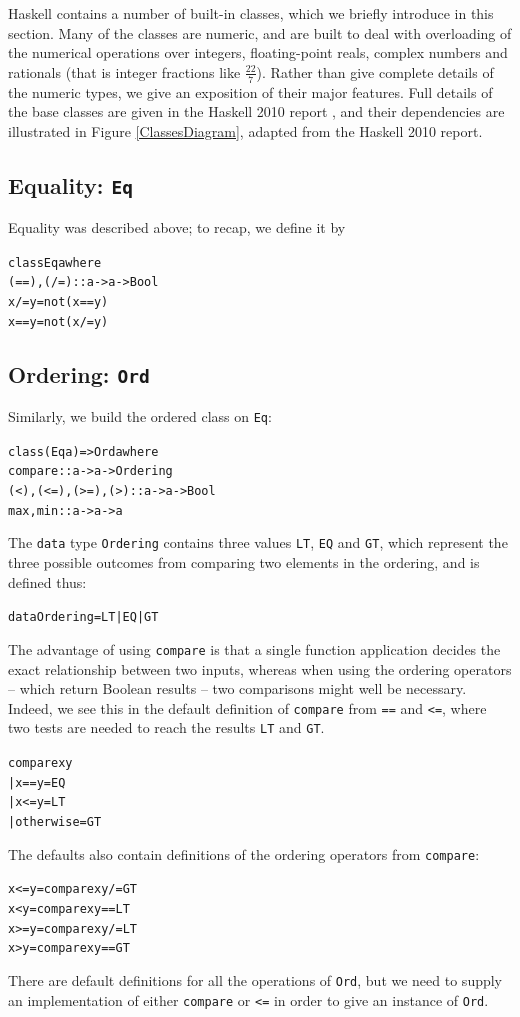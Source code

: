 Haskell contains a number of built-in classes, which we briefly introduce in
this section. Many of the classes are numeric, and are built to deal with
overloading of the numerical operations over integers, floating-point reals,
complex numbers and rationals (that is integer fractions like $\frac{22}{7}$).
Rather than give complete details of the numeric types, we give an exposition
of their major features. Full details of the base classes are given in the Haskell 2010 report \cite{haskell2010}, and their dependencies are illustrated in Figure \ref{ClassesDiagram}, adapted from the Haskell 2010 report.

\subsection*{Equality: \texttt{Eq}}

Equality was described above; to recap, we define it by
\begin{alltt}
class Eq a where
  (==), (/=) :: a -> a -> Bool  
  x /= y   =  not (x==y)
  x == y   =  not (x/=y)
\end{alltt}

\subsection*{Ordering: \texttt{Ord}}

Similarly, we build the ordered class on \texttt{Eq}:
\begin{alltt}
class (Eq a) => Ord a where
  compare              :: a -> a -> Ordering
  (<), (<=), (>=), (>) :: a -> a -> Bool
  max, min             :: a -> a -> a
\end{alltt}
The \texttt{data} type \texttt{Ordering} contains three values
\texttt{LT},
\texttt{EQ} and \texttt{GT}, which represent the three possible
outcomes from comparing two elements in the ordering, and is defined thus:
\begin{alltt}
data Ordering = LT | EQ | GT
\end{alltt} 
The advantage of
using \texttt{compare} is that a single function application decides the exact
relationship between
two inputs,
whereas when using the ordering operators -- which return Boolean results --
two comparisons might well be necessary. Indeed, we see this in the
default definition of \texttt{compare} from \texttt{==} and \texttt{<=},
where two tests are needed to reach the results \texttt{LT} and
\texttt{GT}.
\begin{alltt}
  compare x y
    | x == y      = EQ
    | x <= y      = LT
    | otherwise   = GT
\end{alltt}
The defaults also contain definitions of the ordering operators from \texttt{compare}:
\begin{alltt}
  x <= y          = compare x y /= GT
  x <  y          = compare x y == LT
  x >= y          = compare x y /= LT
  x >  y          = compare x y == GT
\end{alltt}
There are default definitions for all the operations of \texttt{Ord},
but we need to supply an implementation of either 
\texttt{compare} or \texttt{<=} in order to give an instance of \texttt{Ord}.


